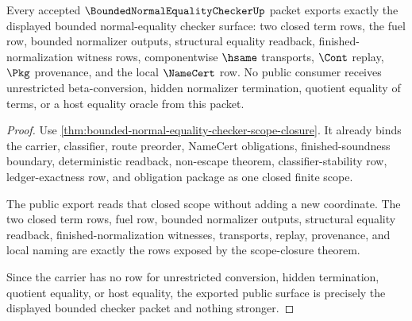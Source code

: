 \begin{theorem}
\label{thm:bounded-normal-equality-checker-public-export}
Every accepted $\BoundedNormalEqualityCheckerUp$ packet exports exactly the displayed bounded normal-equality checker surface: two closed term rows, the fuel row, bounded normalizer outputs, structural equality readback, finished-normalization witness rows, componentwise $\hsame$ transports, $\Cont$ replay, $\Pkg$ provenance, and the local $\NameCert$ row. No public consumer receives unrestricted beta-conversion, hidden normalizer termination, quotient equality of terms, or a host equality oracle from this packet.
\end{theorem}
\begin{proof}
Use \autoref{thm:bounded-normal-equality-checker-scope-closure}. It already binds the carrier, classifier, route preorder, NameCert obligations, finished-soundness boundary, deterministic readback, non-escape theorem, classifier-stability row, ledger-exactness row, and obligation package as one closed finite scope.

The public export reads that closed scope without adding a new coordinate. The two closed term rows, fuel row, bounded normalizer outputs, structural equality readback, finished-normalization witnesses, transports, replay, provenance, and local naming are exactly the rows exposed by the scope-closure theorem.

Since the carrier has no row for unrestricted conversion, hidden termination, quotient equality, or host equality, the exported public surface is precisely the displayed bounded checker packet and nothing stronger.
\end{proof}

